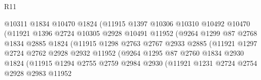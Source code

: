 \begin{lexlean}{R11}
\begin{coremodule}
                                @10311
                                @1834
                                @10470
                                @1824
                                (@11915
                                  @1397
                                  @10306
                                  @10310
                                  @10492
                                  @10470
                                  (@11921
                                    @1396
                                    @2724
                                    @10305
                                    @2928
                                    @10491
                                    @11952
                                    (@9264
                                      @1299
                                      @87
                                      @2768
                                      @1834
                                      @2885
                                      @1824
                                      (@11915
                                        @1298
                                        @2763
                                        @2767
                                        @2933
                                        @2885
                                        (@11921
                                          @1297
                                          @2724
                                          @2762
                                          @2928
                                          @2932
                                          @11952
                                          (@9264
                                            @1295
                                            @87
                                            @2760
                                            @1834
                                            @2930
                                            @1824
                                            (@11915
                                              @1294
                                              @2755
                                              @2759
                                              @2984
                                              @2930
                                              (@11921
                                                @1231
                                                @2724
                                                @2754
                                                @2928
                                                @2983
                                                @11952

\end{coremodule}
\end{lexlean}
